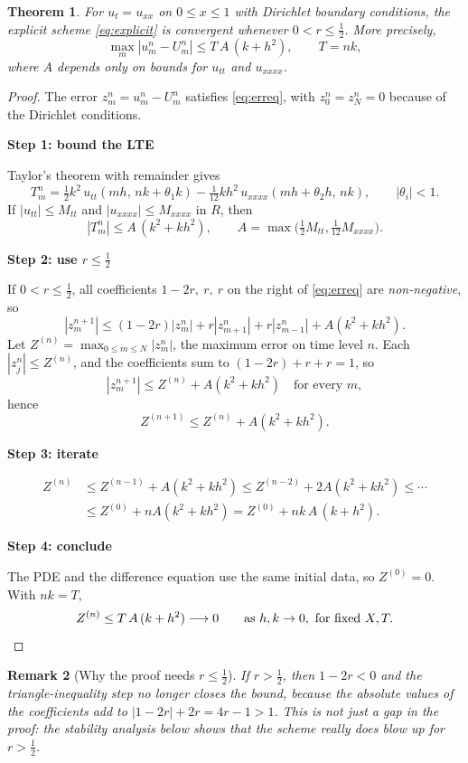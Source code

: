 \documentclass[11pt,a4paper]{article}
\numberwithin{equation}{section}
\theoremstyle{spacedplain}
\newtheorem{theorem}{Theorem}[section]
\theoremstyle{spaceddefinition}
\theoremstyle{spacedremark}
\newtheorem{remark}[theorem]{Remark}
\newcommand{\step}[1]{\par\addvspace{0.6em}\noindent\textbf{#1}\par\nobreak}
\begin{document}
\begin{keybox}
\begin{theorem}\label{thm:conv-explicit}
For \(u_t=u_{xx}\) on \(0\le x\le1\) with Dirichlet boundary
conditions, the explicit scheme \eqref{eq:explicit} is convergent
whenever \(0<r\le\frac12\).  More precisely,
\[
  \max_m|u_m^n-U_m^n|\le T\,A\,(k+h^2),\qquad T=nk,
\]
where \(A\) depends only on bounds for \(u_{tt}\) and \(u_{xxxx}\).
\end{theorem}
\end{keybox}

\begin{proof}
The error \(z_m^n=u_m^n-U_m^n\) satisfies \eqref{eq:erreq}, with
\(z_0^n=z_N^n=0\) because of the Dirichlet conditions.

\step{Step 1: bound the LTE}
Taylor's theorem with remainder gives
\[
  T_m^n=\tfrac12k^2\,u_{tt}(mh,\,nk+\theta_1k)
        -\tfrac1{12}kh^2\,u_{xxxx}(mh+\theta_2h,\,nk),
  \qquad |\theta_i|<1.
\]
If \(|u_{tt}|\le M_{tt}\) and \(|u_{xxxx}|\le M_{xxxx}\) in \(R\), then
\[
  |T_m^n|\le A\,(k^2+kh^2),
  \qquad A=\max\bigl(\tfrac12M_{tt},\tfrac1{12}M_{xxxx}\bigr).
\]

\step{Step 2: use \(r\le\frac12\)}
If \(0<r\le\frac12\), all
coefficients \(1-2r,\ r,\ r\) on the right of \eqref{eq:erreq} are
\emph{non-negative}, so
\[
  |z_m^{n+1}|\le(1-2r)|z_m^n|+r|z_{m+1}^n|+r|z_{m-1}^n|+A(k^2+kh^2).
\]
Let \(Z^{(n)}=\max_{0\le m\le N}|z_m^n|\), the maximum error on time
level \(n\).  Each \(|z_j^n|\le Z^{(n)}\), and the coefficients sum to
\((1-2r)+r+r=1\), so
\[
  |z_m^{n+1}|\le Z^{(n)}+A(k^2+kh^2)\quad\text{for every }m,
\]
hence
\[
  Z^{(n+1)}\le Z^{(n)}+A(k^2+kh^2).
\]

\step{Step 3: iterate}

\begin{align*}
  Z^{(n)}&\le Z^{(n-1)}+A(k^2+kh^2)\le Z^{(n-2)}+2A(k^2+kh^2)\le\cdots\\
  &\le Z^{(0)}+nA(k^2+kh^2)=Z^{(0)}+nk\,A\,(k+h^2).
\end{align*}

\step{Step 4: conclude}
The PDE and the difference equation use the
same initial data, so \(Z^{(0)}=0\).  With \(nk=T\),
\[
  Z^{(n)}\le T\,A\,(k+h^2)\longrightarrow0
  \qquad\text{as }h,k\to0,\ \text{for fixed }X,T. \qedhere
\]
\end{proof}

\begin{remark}[Why the proof needs \(r\le\frac12\)]
If \(r>\frac12\), then \(1-2r<0\) and the triangle-inequality step no
longer closes the bound, because the absolute values of the
coefficients add to \(|1-2r|+2r=4r-1>1\).  This is not just a gap in
the proof: the stability analysis below shows that the scheme really
does blow up for \(r>\frac12\).
\end{remark}
\end{document}
